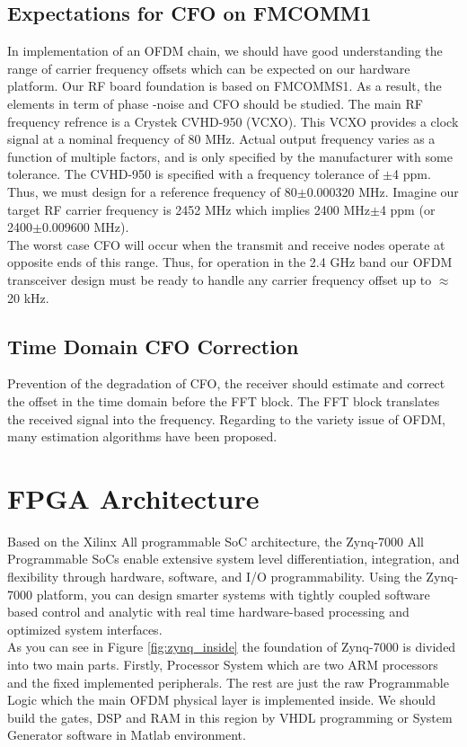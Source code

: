 \subsection{Expectations for CFO on FMCOMM1}

In implementation of an OFDM chain, we should have good understanding the range of carrier frequency offsets which can be expected on our hardware platform. Our RF board foundation is based on FMCOMMS1. As a result, the elements in term of phase -noise and CFO should be studied. The main RF frequency refrence is a Crystek CVHD-950 (VCXO). This VCXO provides a clock signal at a nominal frequency of 80 MHz. Actual output frequency varies as a function of multiple factors, and is only specified by the manufacturer with some tolerance. The CVHD-950 is specified with a frequency tolerance of $\pm$4 ppm. Thus, we must design for a reference frequency of 80$\pm$0.000320 MHz. Imagine our target RF carrier frequency is 2452 MHz which implies 2400 MHz$\pm$4 ppm (or 2400$\pm$0.009600 MHz).\\
The worst case CFO will occur when the transmit and receive nodes operate at opposite ends of this range. Thus, for operation in the 2.4 GHz band our OFDM transceiver design must be ready to handle any carrier frequency offset up to $\approx$20 kHz.


\subsection{Time Domain CFO Correction}
Prevention of the degradation of CFO, the receiver should estimate and correct the offset in the time domain before the FFT block. The FFT block translates the received signal into the frequency. Regarding to the variety issue of OFDM, many estimation algorithms have been proposed.\\

\section{FPGA Architecture}
\label{fpga_arch}
Based on the Xilinx All programmable SoC architecture, the Zynq-7000 All Programmable SoCs \cite{zynq} enable extensive system level differentiation, integration, and flexibility through hardware, software, and I/O programmability. Using the Zynq-7000 platform, you can design smarter systems with tightly coupled software based control and analytic with real time hardware-based processing and optimized system interfaces.\\
As you can see in Figure \ref{fig:zynq_inside} the foundation of Zynq-7000 is divided into two main parts. Firstly, Processor System which are two ARM processors and the fixed implemented peripherals. The rest are just the raw Programmable Logic which the main OFDM physical layer is implemented inside. We should build the gates, DSP and RAM in this region by VHDL programming or System Generator software in Matlab environment.\\


